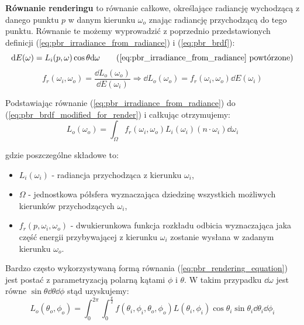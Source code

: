 \documentclass[../main.tex]{subfiles}
\begin{document}
\textbf{Równanie renderingu} to równanie całkowe, określające radiancję wychodzącą z danego punktu $p$ w danym kierunku $\omega_o$ znając radiancję przychodzącą do tego punktu. Równanie te możemy wyprowadzić z poprzednio przedstawionych definicji  (\ref{eq:pbr_irradiance_from_radiance}) i (\ref{eq:pbr_brdf}):
\begin{equation*}
\dd E(\omega) = L_i(p, \omega) \cos\theta \dd\omega
\tag{\ref{eq:pbr_irradiance_from_radiance} powtórzone}
\end{equation*}
\begin{equation}
f_r(\omega_i, \omega_o) = \frac{
    \dd L_{o}(\omega_o)
}{
    \dd E(\omega_i)
} \Rightarrow 
\dd L_{o}(\omega_o) =  f_r(\omega_i, \omega_o) \dd E(\omega_i)
\label{eq:pbr_brdf_modified_for_render}
\end{equation}

Podstawiając równanie (\ref{eq:pbr_irradiance_from_radiance}) do (\ref{eq:pbr_brdf_modified_for_render}) i całkując otrzymujemy:
\begin{equation}
  L_{o}(\omega_o) =
  \int_{\Omega} {
    f_r(\omega_i, \omega_o)
    L_i(\omega_i)
    (n \cdot \omega_i)
    \dd{\omega_i}
  }
\label{eq:pbr_rendering_equation}
\end{equation}

\noindent gdzie poszczególne składowe to:

\begin{itemize}

  \item $L_i(\omega_i)$ - radiancja przychodząca z kierunku $\omega_i$,

  \item $\Omega$ - jednostkowa półsfera wyznaczająca dziedzinę wszystkich
    możliwych kierunków przychodzących $\omega_i$,

  \item $f_{r}(p, \omega_i, \omega_o)$ - dwukierunkowa funkcja rozkładu odbicia wyznaczająca jaka część energii przybywającej z kierunku $\omega_i$ zostanie wysłana w zadanym kierunku $\omega_o$.

\end{itemize}

Bardzo często wykorzystywaną formą równania (\ref{eq:pbr_rendering_equation}) jest postać z parametryzacją polarną kątami $\phi$ i $\theta$. W takim przypadku $\dd \omega$ jest równe $\sin\theta \dd\theta \dd\phi$ \cite{wolfram_solidangle} stąd uzyskujemy:
\begin{equation}
L_{o}(\theta_o, \phi_o) = \int_{0}^{2\pi} \int_{0}^{\frac{\pi}{2}} {
	f(\theta_i, \phi_i, \theta_o, \phi_o)L(\theta_i, \phi_i) \cos\theta_i \sin\theta_i
} \dd\theta_i \dd\phi_i
\label{eq:pbr_rendering_equation_angles}
\end{equation}
\end{document}
